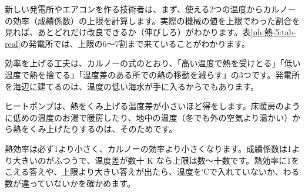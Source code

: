 \begin{phkougaku}
新しい発電所やエアコンを作る技術者は、まず、使える2つの温度からカルノーの効率（成績係数）の上限を計算します。実際の機械の値を上限でわった割合を見れば、あとどれだけ改良できるか（伸びしろ）がわかります。表\ref{ph:熱-5:tab-real}の発電所では、上限の6〜7割まで来ていることがわかります。

効率を上げる工夫は、カルノーの式のとおり、「高い温度で熱を受けとる」「低い温度で熱を捨てる」「温度差のある所での熱の移動を減らす」の3つです。発電所を海辺に建てるのは、温度の低い海水が手に入るからでもあります。

ヒートポンプは、熱をくみ上げる温度差が小さいほど得をします。床暖房のように低めの温度のお湯で暖房したり、地中の温度（冬でも外の空気より温かい）から熱をくみ上げたりするのは、そのためです。

\begin{phketa}[効率と成績係数]
熱効率は必ず1より小さく、カルノーの効率より小さくなります。成績係数は1より大きいのがふつうで、温度差が数十 K なら上限は数〜十数です。熱効率に1をこえる答えや、上限より大きい答えが出たら、温度を℃で入れていないか、わる数が違っていないかを確かめます。
\end{phketa}
\end{phkougaku}

